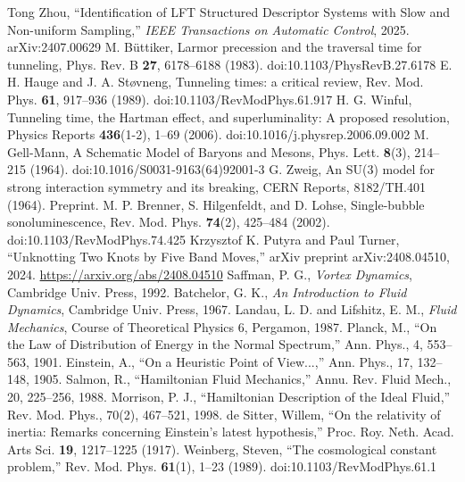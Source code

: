\documentclass[10pt,reprint,aps,onecolumn,nofootinbib]{revtex4-2}
\begin{document}
\begin{thebibliography}{99}
     Tong Zhou, ``Identification of LFT Structured Descriptor Systems with Slow and Non-uniform Sampling,'' \emph{IEEE Transactions on Automatic Control}, 2025. arXiv:2407.00629
     M. B{\"u}ttiker, Larmor precession and the traversal time for tunneling, Phys. Rev. B \textbf{27}, 6178--6188 (1983). doi:10.1103/PhysRevB.27.6178
     E. H. Hauge and J. A. St{\o}vneng, Tunneling times: a critical review, Rev. Mod. Phys. \textbf{61}, 917--936 (1989). doi:10.1103/RevModPhys.61.917
     H. G. Winful, Tunneling time, the Hartman effect, and superluminality: A proposed resolution,    Physics Reports \textbf{436}(1-2), 1--69 (2006). doi:10.1016/j.physrep.2006.09.002
     M. Gell-Mann, A Schematic Model of Baryons and Mesons, Phys. Lett. \textbf{8}(3), 214--215 (1964). doi:10.1016/S0031-9163(64)92001-3
     G. Zweig, An SU(3) model for strong interaction symmetry and its breaking, CERN Reports, 8182/TH.401 (1964). Preprint.
     M. P. Brenner, S. Hilgenfeldt, and D. Lohse, Single-bubble sonoluminescence, Rev. Mod. Phys. \textbf{74}(2), 425--484 (2002). doi:10.1103/RevModPhys.74.425
     Krzysztof K. Putyra and Paul Turner, ``Unknotting Two Knots by Five Band Moves,'' arXiv preprint arXiv:2408.04510, 2024. \url{https://arxiv.org/abs/2408.04510}
     Saffman, P. G., \emph{Vortex Dynamics}, Cambridge Univ. Press, 1992.
     Batchelor, G. K., \emph{An Introduction to Fluid Dynamics}, Cambridge Univ. Press, 1967.
     Landau, L. D. and Lifshitz, E. M., \emph{Fluid Mechanics}, Course of Theoretical Physics 6, Pergamon, 1987.
     Planck, M., ``On the Law of Distribution of Energy in the Normal Spectrum,'' Ann. Phys., 4, 553--563, 1901.
     Einstein, A., ``On a Heuristic Point of View...,'' Ann. Phys., 17, 132--148, 1905.
     Salmon, R., ``Hamiltonian Fluid Mechanics,'' Annu. Rev. Fluid Mech., 20, 225--256, 1988.
     Morrison, P. J., ``Hamiltonian Description of the Ideal Fluid,'' Rev. Mod. Phys., 70(2), 467--521, 1998.
     de Sitter, Willem, ``On the relativity of inertia: Remarks concerning Einstein’s latest hypothesis,'' Proc. Roy. Neth. Acad. Arts Sci. \textbf{19}, 1217–1225 (1917).
     Weinberg, Steven, ``The cosmological constant problem,'' Rev. Mod. Phys. \textbf{61}(1), 1--23 (1989). doi:10.1103/RevModPhys.61.1

\end{thebibliography}
\end{document}
